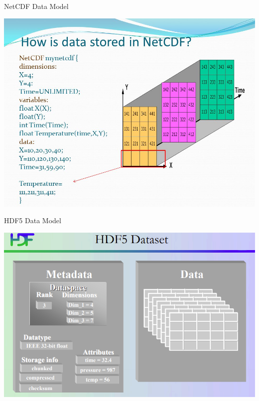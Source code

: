 \documentclass[compress,11pt,xcolor=svgnames,aspectratio=169]{beamer}
\begin{document}
\begin{frame}[t]{NetCDF Data Model}

\begin{center}
\includegraphics[scale=0.4]{fig/netcdf-data}
\end{center}


\end{frame}

\begin{frame}[t]{HDF5 Data Model}

\begin{center}
\includegraphics[scale=0.5]{fig/hdf5-data}
\end{center}


\end{frame}
\end{document}
